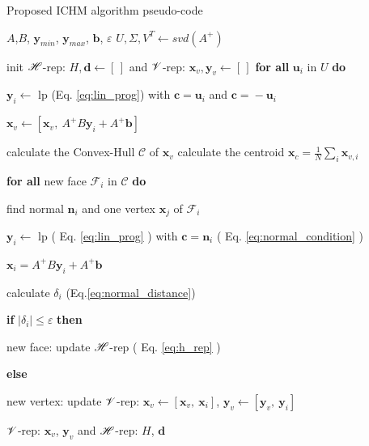 \begin{algorithm}[!h]
\caption{Proposed ICHM algorithm pseudo-code}
\begin{algorithmic}
\REQUIRE $A$,$B$, $\bm{y}_{min}$, $\bm{y}_{max}$, $\bm{b}$, $\varepsilon$
\STATE $U, \Sigma, V^T \leftarrow svd(A^+)$ 

\STATE init $\mathscr{H}$-rep: $H,\bm{d} \leftarrow [\,]$ and $\mathscr{V}$-rep: $\bm{x}_v,\bm{y}_v\leftarrow [\,]$
\STATE \textbf{for all}   {$\bm{u}_i$ in $U$} \textbf{do}

\hspace{0.3cm} $\bm{y}_{i}\leftarrow$ \gls{lp} (Eq. \ref{eq:lin_prog}) with $\bm{c}\! =\! \bm{u}_i$ and $\bm{c}\! =\! -\bm{u}_i$

\hspace{0.3cm} $\bm{x}_{v} \leftarrow [\bm{x}_{v}, ~ A^+B\bm{y}_i + A^+\bm{b}]$

\REPEAT

\STATE calculate the Convex-Hull $\mathcal{C}$ of $\bm{x}_{v}$
\STATE calculate the centroid $\bm{x}_{c} = \frac{1}{N}\sum_i\bm{x}_{v,i}$

\STATE \textbf{for all}   {new face $\mathcal{F}_i$ in $\mathcal{C}$} \textbf{do}

\hspace{0.25cm} find normal $\bm{n}_i$ and one vertex $\bm{x}_{j}$ of $\mathcal{F}_i$

\hspace{0.25cm} $\bm{y}_{i}\leftarrow$ \gls{lp} ( Eq. \ref{eq:lin_prog} ) with  $\bm{c}\! =\! \bm{n}_i$ ( Eq. \ref{eq:normal_condition} )

\hspace{0.25cm} $\bm{x}_{i} = A^+B\bm{y}_i+A^+\bm{b}$ 

\hspace{0.25cm}  calculate $\delta_i$ (Eq.\ref{eq:normal_distance})

\hspace{0.25cm}  \textbf{if}   $ |\delta_i| \leq \varepsilon$ \textbf{then} 

\hspace{0.6cm}  new face: update $\mathscr{H}$-rep  ( Eq. \ref{eq:h_rep} )

\hspace{0.25cm}  \textbf{else}

\hspace{0.6cm} new vertex: update $\mathscr{V}$-rep: $\bm{x}_{v} \!\leftarrow\! [\bm{x}_{v},~ \bm{x}_i ]$,  $\bm{y}_{v} \!\leftarrow\! [\bm{y}_{v},~ \bm{y}_i ]$ 

{}
\RETURN  $\mathscr{V}$-rep: $\bm{x}_v$, $\bm{y}_v$ and  $\mathscr{H}$-rep: $H$, $\bm{d}$ 
\end{algorithmic}
\label{alg:algo_2}
\end{algorithm}

